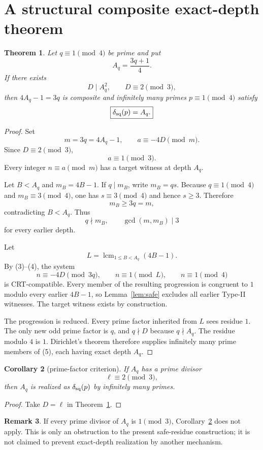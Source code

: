 \documentclass[11pt]{article}
\newtheorem{theorem}{Theorem}
\newtheorem{corollary}[theorem]{Corollary}
\theoremstyle{definition}
\newtheorem{remark}[theorem]{Remark}
\begin{document}
\section{A structural composite exact-depth theorem}
\begin{theorem}\label{thm:structural}
Let $q\equiv1\pmod4$ be prime and put
\[
A_q=\frac{3q+1}{4}.
\]
If there exists
\[
D\mid A_q^2,
\qquad
D\equiv2\pmod3,
\]
then $4A_q-1=3q$ is composite and infinitely many primes $p\equiv1\pmod4$ satisfy
\[
\boxed{\delta_{\rm sq}(p)=A_q.}
\]
\end{theorem}

\begin{proof}
Set
\[
m=3q=4A_q-1,
\qquad
a\equiv-4D\pmod m.
\]
Since $D\equiv2\pmod3$,
\[
a\equiv1\pmod3. \tag{3}
\]
Every integer $n\equiv a\pmod m$ has a target witness at depth $A_q$.

Let $B<A_q$ and $m_B=4B-1$.  If $q\mid m_B$, write $m_B=qs$.  Because $q\equiv1\pmod4$ and $m_B\equiv3\pmod4$, one has $s\equiv3\pmod4$ and hence $s\ge3$.  Therefore
\[
m_B\ge3q=m,
\]
contradicting $B<A_q$.  Thus
\[
q\nmid m_B,
\qquad
\gcd(m,m_B)\mid3 \tag{4}
\]
for every earlier depth.

Let
\[
L=\operatorname{lcm}_{1\le B<A_q}(4B-1).
\]
By (3)--(4), the system
\[
n\equiv-4D\pmod{3q},
\qquad
n\equiv1\pmod L,
\qquad
n\equiv1\pmod4 \tag{5}
\]
is CRT-compatible.  Every member of the resulting progression is congruent to $1$ modulo every earlier $4B-1$, so Lemma~\ref{lem:safe} excludes all earlier Type-II witnesses.  The target witness exists by construction.

The progression is reduced.  Every prime factor inherited from $L$ sees residue $1$.  The only new odd prime factor is $q$, and $q\nmid D$ because $q\nmid A_q$.  The residue modulo $4$ is $1$.  Dirichlet's theorem therefore supplies infinitely many prime members of (5), each having exact depth $A_q$.
\end{proof}

\begin{corollary}[prime-factor criterion]\label{cor:pf}
If $A_q$ has a prime divisor
\[
\ell\equiv2\pmod3,
\]
then $A_q$ is realized as $\delta_{\rm sq}(p)$ by infinitely many primes.
\end{corollary}

\begin{proof}
Take $D=\ell$ in Theorem~\ref{thm:structural}.
\end{proof}

\begin{remark}
If every prime divisor of $A_q$ is $1\pmod3$, Corollary~\ref{cor:pf} does not apply.  This is only an obstruction to the present safe-residue construction; it is not claimed to prevent exact-depth realization by another mechanism.
\end{remark}
\end{document}
